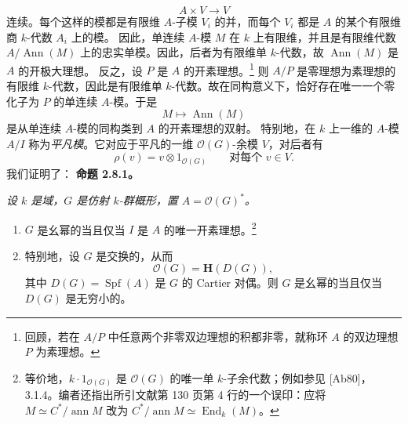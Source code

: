 \[
  A\times V\longrightarrow V
\]
连续。每个这样的模都是有限维 \(A\)-子模 \(V_i\) 的并，而每个 \(V_i\) 都是 \(A\) 的某个有限维商 \(k\)-代数 \(A_i\) 上的模。
因此，单连续 \(A\)-模 \(M\) 在 \(k\) 上有限维，并且是有限维代数 \(A/\operatorname{Ann}(M)\) 上的忠实单模。因此，后者为有限维单 \(k\)-代数，故 \(\operatorname{Ann}(M)\) 是 \(A\) 的开极大理想。
反之，设 \(P\) 是 \(A\) 的开素理想。\footnote{\label{sga3:VIIB:nde:116}回顾，若在 \(A/P\) 中任意两个非零双边理想的积都非零，就称环 \(A\) 的双边理想 \(P\) 为素理想。}
则 \(A/P\) 是零理想为素理想的有限维 \(k\)-代数，因此是有限维单 \(k\)-代数。故在同构意义下，恰好存在唯一一个零化子为 \(P\) 的单连续 \(A\)-模。于是
\[
  M\longmapsto\operatorname{Ann}(M)
\]
是从单连续 \(A\)-模的同构类到 \(A\) 的开素理想的双射。
特别地，在 \(k\) 上一维的 \(A\)-模 \(A/I\) 称为\emph{平凡模}。它对应于平凡的一维 \(\mathcal O(G)\)-余模 \(V\)，对后者有
\[
  \rho(v)=v\otimes1_{\mathcal O(G)}
  \qquad\text{对每个 }v\in V.
\]
我们证明了：
\medskip
\noindent\textbf{命题 2.8.1。}
\label{sga3:VIIB:2.8.1}
{\itshape 设 \(k\) 是域，\(G\) 是仿射 \(k\)-群概形，置 \(A=\mathcal O(G)^*\)。
\begin{enumerate}
\item[\textup{(i)}] \(G\) 是幺幂的当且仅当 \(I\) 是 \(A\) 的唯一开素理想。\footnote{\label{sga3:VIIB:nde:117}等价地，\(k\cdot1_{\mathcal O(G)}\) 是 \(\mathcal O(G)\) 的唯一单 \(k\)-子余代数；例如参见 [Ab80]，3.1.4。编者还指出所引文献第 130 页第 4 行的一个误印：应将 \(M\simeq C^*/\operatorname{ann}M\) 改为 \(C^*/\operatorname{ann}M\simeq\operatorname{End}_k(M)\)。}
\item[\textup{(ii)}] 特别地，设 \(G\) 是交换的，从而
\[
  \mathcal O(G)=\mathbf H(D(G)),
\]
其中 \(D(G)=\operatorname{Spf}(A)\) 是 \(G\) 的 Cartier 对偶。则 \(G\) 是幺幂的当且仅当 \(D(G)\) 是无穷小的。
\end{enumerate}}
